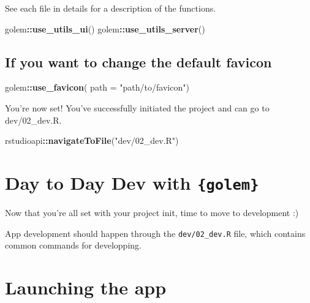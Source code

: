 \documentclass[]{book}
\newenvironment{Shaded}{\begin{snugshade}}{\end{snugshade}}
\newcommand{\DataTypeTok}[1]{\textcolor[rgb]{0.13,0.29,0.53}{#1}}
\newcommand{\KeywordTok}[1]{\textcolor[rgb]{0.13,0.29,0.53}{\textbf{#1}}}
\newcommand{\NormalTok}[1]{#1}
\newcommand{\OperatorTok}[1]{\textcolor[rgb]{0.81,0.36,0.00}{\textbf{#1}}}
\newcommand{\StringTok}[1]{\textcolor[rgb]{0.31,0.60,0.02}{#1}}
\begin{document}
See each file in details for a description of the functions.

\begin{Shaded}
\begin{Highlighting}[]
\NormalTok{golem}\OperatorTok{::}\KeywordTok{use_utils_ui}\NormalTok{()}
\NormalTok{golem}\OperatorTok{::}\KeywordTok{use_utils_server}\NormalTok{()}
\end{Highlighting}
\end{Shaded}

\hypertarget{if-you-want-to-change-the-default-favicon}{%
\subsection{If you want to change the default favicon}\label{if-you-want-to-change-the-default-favicon}}

\begin{Shaded}
\begin{Highlighting}[]
\NormalTok{golem}\OperatorTok{::}\KeywordTok{use_favicon}\NormalTok{( }\DataTypeTok{path =} \StringTok{"path/to/favicon"}\NormalTok{)}
\end{Highlighting}
\end{Shaded}

You're now set! You've successfully initiated the project and can go to dev/02\_dev.R.

\begin{Shaded}
\begin{Highlighting}[]
\NormalTok{rstudioapi}\OperatorTok{::}\KeywordTok{navigateToFile}\NormalTok{(}\StringTok{"dev/02_dev.R"}\NormalTok{)}
\end{Highlighting}
\end{Shaded}

\hypertarget{day-to-day-dev-with-golem}{%
\section{\texorpdfstring{Day to Day Dev with \texttt{\{golem\}}}{Day to Day Dev with \{golem\}}}\label{day-to-day-dev-with-golem}}

Now that you're all set with your project init, time to move to development :)

App development should happen through the \texttt{dev/02\_dev.R} file, which contains common commands for developping.

\hypertarget{launching-the-app}{%
\section{Launching the app}\label{launching-the-app}}
\end{document}
